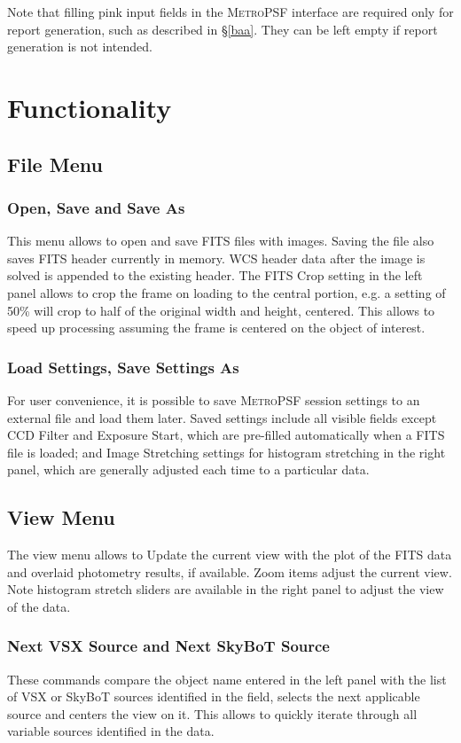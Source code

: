 \documentclass{article}
\begin{document}
Note that filling pink input fields in the \textsc{MetroPSF} interface are required only for report generation, such as described in \S \ref{baa}. They can be left empty if report generation is not intended.

\section{Functionality} \label{functionality}
\subsection{File Menu}
\subsubsection{Open, Save and Save As}
This menu allows to open and save FITS files with images. Saving the file also saves FITS header currently in memory. WCS header data after the image is solved is appended to the existing header. The FITS Crop setting in the left panel allows to crop the frame on loading to the central portion, e.g. a setting of 50\% will crop to half of the original width and height, centered. This allows to speed up processing assuming the frame is centered on the object of interest.
\subsubsection{Load Settings, Save Settings As}
For user convenience, it is possible to save \textsc{MetroPSF} session settings to an external file and load them later. Saved settings include all visible fields except CCD Filter and Exposure Start, which are pre-filled automatically when a FITS file is loaded; and Image Stretching settings for histogram stretching in the right panel, which are generally adjusted each time to a particular data. 
\subsection{View Menu}
The view menu allows to Update the current view with the plot of the FITS data and overlaid photometry results, if available. Zoom items adjust the current view. Note histogram stretch sliders are available in the right panel to adjust the view of the data.
\subsubsection{Next VSX Source and Next SkyBoT Source}
These commands compare the object name entered in the left panel with the list of VSX or SkyBoT sources identified in the field, selects the next applicable source and centers the view on it. This allows to quickly iterate through all variable sources identified in the data.
\end{document}
